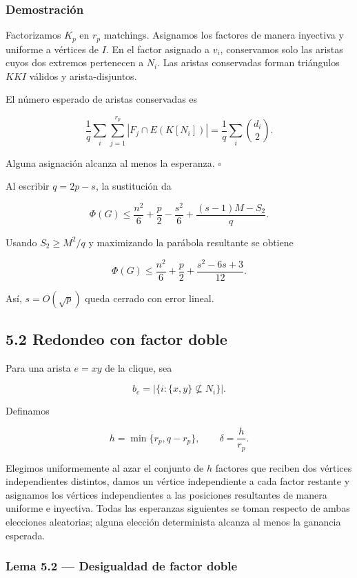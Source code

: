 \documentclass[
  11pt,
]{article}
\begin{document}
\subsubsection{Demostración}\label{demostraciuxf3n-3}

Factorizamos \(K_p\) en \(r_p\) matchings. Asignamos los factores de
manera inyectiva y uniforme a vértices de \(I\). En el factor asignado a
\(v_i\), conservamos solo las aristas cuyos dos extremos pertenecen a
\(N_i\). Las aristas conservadas forman triángulos \(KKI\) válidos y
arista-disjuntos.

El número esperado de aristas conservadas es

\[
\frac1q\sum_i\sum_{j=1}^{r_p}|F_j\cap E(K[N_i])|
=
\frac1q\sum_i\binom{d_i}{2}.
\]

Alguna asignación alcanza al menos la esperanza. \(\square\)

Al escribir \(q=2p-s\), la sustitución da

\[
\Phi(G)
\le
\frac{n^2}{6}+\frac p2-\frac{s^2}{6}
+
\frac{(s-1)M-S_2}{q}.
\tag{5.2}
\]

Usando \(S_2\ge M^2/q\) y maximizando la parábola resultante se obtiene

\[
\boxed{
\Phi(G)
\le
\frac{n^2}{6}+\frac p2+\frac{s^2-6s+3}{12}.
}
\tag{5.3}
\]

Así, \(s=O(\sqrt p)\) queda cerrado con error lineal.

\subsection{5.2 Redondeo con factor
doble}\label{redondeo-con-factor-doble}

Para una arista \(e=xy\) de la clique, sea

\[
b_e=|\{i:\{x,y\}\not\subseteq N_i\}|.
\]

Definamos

\[
h=\min\{r_p,q-r_p\},
\qquad
\delta=\frac h{r_p}.
\]

Elegimos uniformemente al azar el conjunto de \(h\) factores que reciben
dos vértices independientes distintos, damos un vértice independiente a
cada factor restante y asignamos los vértices independientes a las
posiciones resultantes de manera uniforme e inyectiva. Todas las
esperanzas siguientes se toman respecto de ambas elecciones aleatorias;
alguna elección determinista alcanza al menos la ganancia esperada.

\subsubsection{Lema 5.2 --- Desigualdad de factor
doble}\label{lema-5.2-desigualdad-de-factor-doble}
\end{document}
